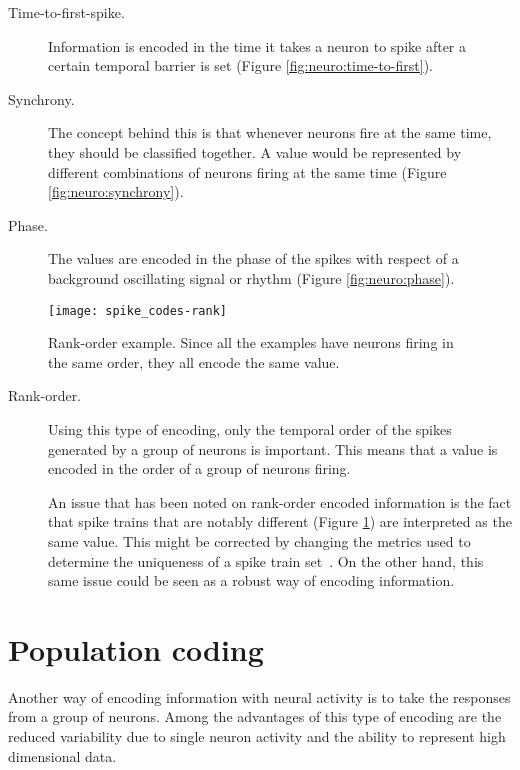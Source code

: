\begin{description}
  \item[Time-to-first-spike.] Information is encoded in the time it takes a neuron to spike after a certain temporal barrier is set (Figure \ref{fig:neuro:time-to-first}).
  
  \item[Synchrony.] The concept behind this is that whenever neurons fire at the same time, they should be classified together. A value would be represented by different combinations of neurons firing at the same time (Figure \ref{fig:neuro:synchrony}).
  
  \item[Phase.]   The values are encoded in the phase of the spikes with respect of a background oscillating signal or rhythm (Figure \ref{fig:neuro:phase}).
\end{description}

\begin{figure}[hbt]
  \begin{center}
    \texttt{[image: spike\_codes-rank]}
    \caption{Rank-order example. Since all the examples have neurons firing in the same order, they all encode the same value.}
    \label{fig:neuro:spike-rank-order}
  \end{center}
\end{figure}

\begin{description}
  \item[Rank-order.]
  Using this type of encoding, only the temporal order of the spikes generated by a group of neurons is important. This means that a value is encoded in the order of a group of neurons firing.
  
  An issue that has been noted on rank-order encoded information is the fact that spike trains that are notably different (Figure \ref{fig:neuro:spike-rank-order}) are interpreted as the same value. This might be corrected by changing the metrics used to determine the uniqueness of a spike train set~\cite{Cessac2010}. On the other hand, this same issue could be seen as a robust way of encoding information.
  
\end{description}

\section{Population coding}
Another way of encoding information with neural activity is to take the responses from a group of neurons. Among the advantages of this type of encoding are the reduced variability due to single neuron activity and the ability to represent high dimensional data.



